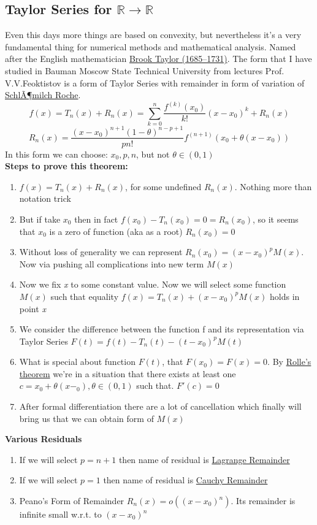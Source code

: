 \documentclass[12pt,a4paper]{article}
\theoremstyle{plain}
\begin{document}
\subsection{Taylor Series for $\mathbb{R} \to \mathbb{R}$}
Even this days more things are based on convexity, but nevertheless it’s a very fundamental thing for numerical methods and mathematical analysis. 
Named after the English mathematician \href{https://en.wikipedia.org/wiki/Brook_Taylor}{Brook Taylor (1685–1731)}.
The form that I have studied in Bauman Moscow State Technical University from lectures Prof. V.V.Feoktistov is a form of Taylor Series with remainder in form of variation of \href{https://mathworld.wolfram.com/SchloemilchRemainder.html}{SchlÃ¶milch Roche}.
\begin{equation}
 f(x)=T_n(x)+R_n(x)=\sum_{k=0}^{n} \dfrac{f^{(k)}(x_0)}{k!}(x-x_0)^k+R_n(x)
\end{equation}
\begin{equation}
 R_n(x)=\dfrac{(x-x_0)^{n+1}(1-\theta)^{n-p+1}}{pn!}f^{(n+1)}(x_0+\theta(x-x_0)) 
\end{equation}
In this form we can choose: \textbf{$x_0,p,n$}, but not $\theta \in (0,1)$\\
\textbf{Steps to prove this theorem:}
\begin{enumerate}
 \item $f(x)=T_n(x)+R_n(x)$, for some undefined $R_n(x)$. Nothing more than notation trick
 \item But if take $x_0$ then in fact $f(x_0)-T_n(x_0)=0=R_n(x_0)$, so it seems that $x_0$ is a zero of function (aka as a root) $R_n(x_0)=0$
 \item Without loss of generality we can represent $R_n(x_0)=(x-x_0)^pM(x)$. Now via pushing all complications into new term $M(x)$
 \item Now we fix \textit{x} to some constant value. Now we will select some function $M(x)$ such that equality 
 $f(x)=T_n(x)+(x-x_0)^pM(x)$ holds in point \textit{x}
 \item We consider the difference between the function f and its representation via Taylor Series $F(t)=f(t)-T_n(t)-(t-x_0)^pM(t)$ 
 \item What is special about function $F(t)$, that $F(x_0)=F(x)=0$. By \href{https://en.wikipedia.org/wiki/Rolle\%27s_theorem}{Rolle’s theorem} we’re in a situation that there exists at least one $c=x_0+\theta(x-_0), \theta \in (0,1)$ such that. $F'(c)=0$
 \item After formal differentiation there are a lot of cancellation which finally will bring us that we can obtain form of $M(x)$ 
\end{enumerate}
\textbf{Various Residuals}
\begin{enumerate}
 \item If we will select $p=n+1$ then name of residual is \href{https://mathworld.wolfram.com/LagrangeRemainder.html}{Lagrange Remainder}
 \item If we will select $p=1$ then name of residual is \href{https://mathworld.wolfram.com/CauchyRemainder.html}{Cauchy Remainder} 
 \item Peano’s Form of Remainder $R_n(x)=o((x-x_0)^n)$. Its remainder is infinite small w.r.t. to $(x-x_0)^n$
\end{enumerate}
\end{document}
